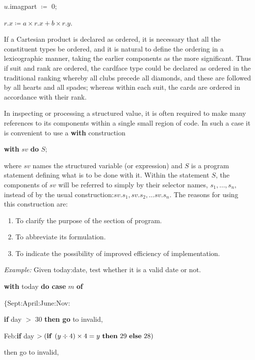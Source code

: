 \quad $u$.imagpart $\coloneq$ 0;

\quad $r.x \coloneq a\times r.x + b\times r.y$.

If a Cartesian product is declared as ordered, it is necessary that all the constituent types be ordered, and it is natural to define the ordering in a lexicographic manner, taking the earlier components as the more significant. Thus if suit and rank are ordered, the cardface type could be declared as ordered in the traditional ranking whereby all clubs precede all diamonds, and these are followed by all hearts and all spades; whereas within each suit, the cards are ordered in accordance with their rank.

In inspecting or processing a structured value, it is often required to make many references to its components within a single small region of code. In such a case it is convenient to use a \textbf{with} construction

\quad \textbf{with} $sv$ \textbf{do} $S$;

\noindent
where $sv$ names the structured variable (or expression) and $S$ is a program statement defining what is to be done with it. Within the statement $S$, the components of $sv$ will be referred to simply by their selector names, $s_1, \dots, s_n,$ instead of by the usual construction:$sv.s_1, sv.s_2, \dots sv.s_n$. The reasons for using this construction are:

\begin{enumerate}[leftmargin=2\parindent, label=(\arabic*)]
	\item To clarify the purpose of the section of program.
	\item To abbreviate its formulation.
	\item To indicate the possibility of improved efficiency of implementation.
\end{enumerate}

\noindent
\textit{Example:} Given today:date, test whether it is a valid date or not.

\quad \textbf{with} today \textbf{do case} $m$ \textbf{of}

\quad \quad $\{$Sept:April:June:Nov:

\quad \quad \quad \textbf{if} day $>$ 30 \textbf{then go} to invalid,

\quad \quad \quad Feb:\textbf{if} day $> (\text{\textbf{if }} (y \div 4) \times 4 = y \text{ \textbf{then} } 29 \text{ \textbf{else} } 28)$

\quad \quad \quad \quad then go to invalid,


